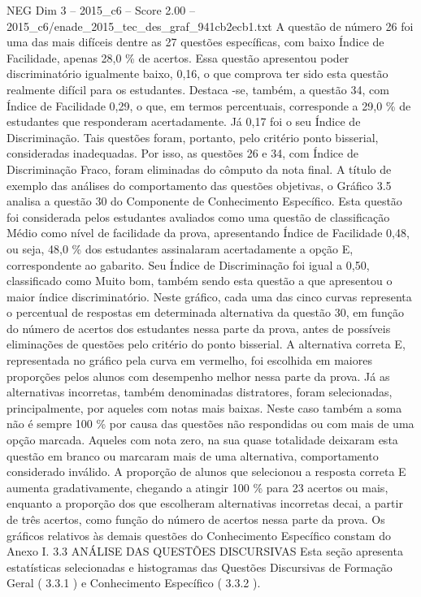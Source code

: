 \begin{textsample}{NEG Dim 3 – 2015\_c6 – Score 2.00 – 2015\_c6/enade\_2015\_tec\_des\_graf\_941cb2ecb1.txt}
A questão de número 26 foi uma das mais difíceis dentre as 27 questões específicas, com baixo Índice de Facilidade, apenas 28,0 \% de acertos.
Essa questão apresentou poder discriminatório igualmente baixo, 0,16, o que comprova ter sido esta questão realmente difícil para os estudantes.
Destaca -se, também, a questão 34, com Índice de Facilidade 0,29, o que, em termos percentuais, corresponde a 29,0 \% de estudantes que responderam acertadamente.
Já 0,17 foi o seu Índice de Discriminação.
Tais questões foram, portanto, pelo critério ponto bisserial, consideradas inadequadas.
Por isso, as questões 26 e 34, com Índice de Discriminação Fraco, foram eliminadas do cômputo da nota final.
A título de exemplo das análises do comportamento das questões objetivas, o Gráfico 3.5 analisa a questão 30 do Componente de Conhecimento Específico.
Esta questão foi considerada pelos estudantes avaliados como uma questão de classificação Médio como nível de facilidade da prova, apresentando Índice de Facilidade 0,48, ou seja, 48,0 \% dos estudantes assinalaram acertadamente a opção E, correspondente ao gabarito.
Seu Índice de Discriminação foi igual a 0,50, classificado como Muito bom, também sendo esta questão a que apresentou o maior índice discriminatório.
Neste gráfico, cada uma das cinco curvas representa o percentual de respostas em determinada alternativa da questão 30, em função do número de acertos dos estudantes nessa parte da prova, antes de possíveis eliminações de questões pelo critério do ponto bisserial.
A alternativa correta E, representada no gráfico pela curva em vermelho, foi escolhida em maiores proporções pelos alunos com desempenho melhor nessa parte da prova.
Já as alternativas incorretas, também denominadas distratores, foram selecionadas, principalmente, por aqueles com notas mais baixas.
Neste caso também a soma não é sempre 100 \% por causa das questões não respondidas ou com mais de uma opção marcada.
Aqueles com nota zero, na sua quase totalidade deixaram esta questão em branco ou marcaram mais de uma alternativa, comportamento considerado inválido.
A proporção de alunos que selecionou a resposta correta E aumenta gradativamente, chegando a atingir 100 \% para 23 acertos ou mais, enquanto a proporção dos que escolheram alternativas incorretas decai, a partir de três acertos, como função do número de acertos nessa parte da prova.
Os gráficos relativos às demais questões do Conhecimento Específico constam do Anexo I. 3.3 ANÁLISE DAS QUESTÕES DISCURSIVAS Esta seção apresenta estatísticas selecionadas e histogramas das Questões Discursivas de Formação Geral ( 3.3.1 ) e Conhecimento Específico ( 3.3.2 ).

\end{textsample}
